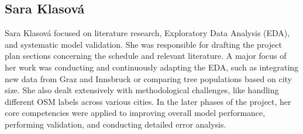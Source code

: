 \subsection*{Sara Klasová}
Sara Klasová focused on literature research, Exploratory Data Analysis (EDA), and systematic model validation. She was responsible for drafting the project plan sections concerning the schedule and relevant literature. A major focus of her work was conducting and continuously adapting the EDA, such as integrating new data from Graz and Innsbruck or comparing tree populations based on city size. She also dealt extensively with methodological challenges, like handling different OSM labels across various cities. In the later phases of the project, her core competencies were applied to improving overall model performance, performing validation, and conducting detailed error analysis.

